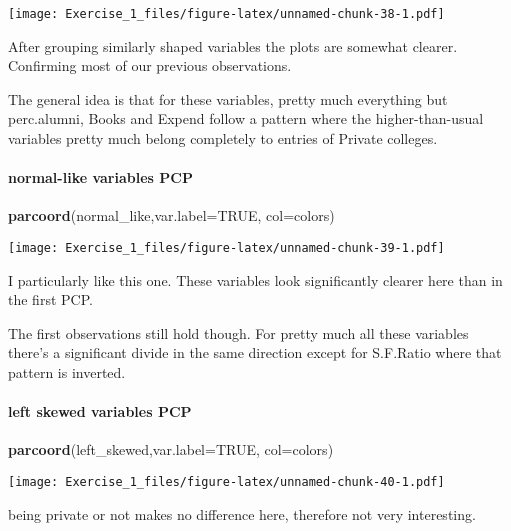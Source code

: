 \documentclass[]{article}
\newenvironment{Shaded}{\begin{snugshade}}{\end{snugshade}}
\newcommand{\DataTypeTok}[1]{\textcolor[rgb]{0.13,0.29,0.53}{#1}}
\newcommand{\KeywordTok}[1]{\textcolor[rgb]{0.13,0.29,0.53}{\textbf{#1}}}
\newcommand{\NormalTok}[1]{#1}
\newcommand{\OtherTok}[1]{\textcolor[rgb]{0.56,0.35,0.01}{#1}}
\let\oldparagraph\paragraph
\renewcommand{\paragraph}[1]{\oldparagraph{#1}\mbox{}}
\begin{document}
\texttt{[image: Exercise\_1\_files/figure-latex/unnamed-chunk-38-1.pdf]}

After grouping similarly shaped variables the plots are somewhat
clearer. Confirming most of our previous observations.

The general idea is that for these variables, pretty much everything but
perc.alumni, Books and Expend follow a pattern where the
higher-than-usual variables pretty much belong completely to entries of
Private colleges.

\hypertarget{normal-like-variables-pcp}{%
\paragraph{normal-like variables PCP}\label{normal-like-variables-pcp}}

\begin{Shaded}
\begin{Highlighting}[]
\KeywordTok{parcoord}\NormalTok{(normal_like,}\DataTypeTok{var.label=}\OtherTok{TRUE}\NormalTok{, }\DataTypeTok{col=}\NormalTok{colors)}
\end{Highlighting}
\end{Shaded}

\texttt{[image: Exercise\_1\_files/figure-latex/unnamed-chunk-39-1.pdf]}

I particularly like this one. These variables look significantly clearer
here than in the first PCP.

The first observations still hold though. For pretty much all these
variables there's a significant divide in the same direction except for
S.F.Ratio where that pattern is inverted.

\hypertarget{left-skewed-variables-pcp}{%
\paragraph{left skewed variables PCP}\label{left-skewed-variables-pcp}}

\begin{Shaded}
\begin{Highlighting}[]
\KeywordTok{parcoord}\NormalTok{(left_skewed,}\DataTypeTok{var.label=}\OtherTok{TRUE}\NormalTok{, }\DataTypeTok{col=}\NormalTok{colors)}
\end{Highlighting}
\end{Shaded}

\texttt{[image: Exercise\_1\_files/figure-latex/unnamed-chunk-40-1.pdf]}

being private or not makes no difference here, therefore not very
interesting.
\end{document}
